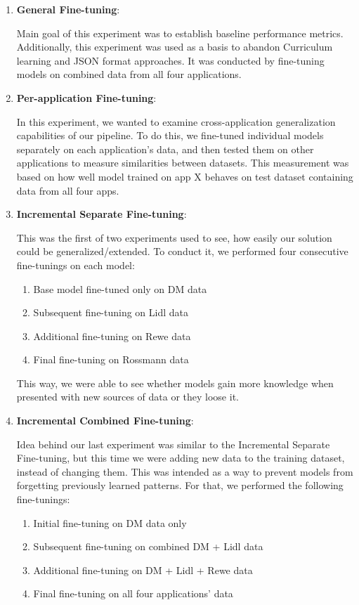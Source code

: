 \documentclass[licencjacka,en]{pracamgr}
\begin{document}
\begin{enumerate}
    \item \textbf{General Fine-tuning}:
    
    Main goal of this experiment was to establish baseline performance metrics. Additionally, this experiment was used as a basis to abandon
    Curriculum learning and JSON format approaches. It was conducted by fine-tuning models on combined data from all four applications.
    
    \item \textbf{Per-application Fine-tuning}:

    In this experiment, we wanted to examine cross-application generalization capabilities of our pipeline. To do this, we fine-tuned individual models separately on each application's data, and then tested them on other applications to measure similarities between datasets. This measurement was based on how well model trained on app X behaves on test dataset containing data from all four apps.
    
    \item \textbf{Incremental Separate Fine-tuning}:

    This was the first of two experiments used to see, how easily our solution could be generalized/extended. To conduct it, we performed four consecutive fine-tunings on each model:

    \begin{enumerate}
        \item Base model fine-tuned only on DM data
        \item Subsequent fine-tuning on Lidl data
        \item Additional fine-tuning on Rewe data
        \item Final fine-tuning on Rossmann data
    \end{enumerate}
    This way, we were able to see whether models gain more knowledge when presented with new sources of data or they loose it.
    
    \item \textbf{Incremental Combined Fine-tuning}:

    Idea behind our last experiment was similar to the Incremental Separate Fine-tuning, but this time we were adding new data to the training dataset, instead of changing them. This was intended as a way to prevent models from forgetting previously learned patterns. For that, we performed the following fine-tunings:
    \begin{enumerate}
        \item Initial fine-tuning on DM data only
        \item Subsequent fine-tuning on combined DM + Lidl data
        \item Additional fine-tuning on DM + Lidl + Rewe data
        \item Final fine-tuning on all four applications' data
    \end{enumerate}
\end{enumerate}
\end{document}
